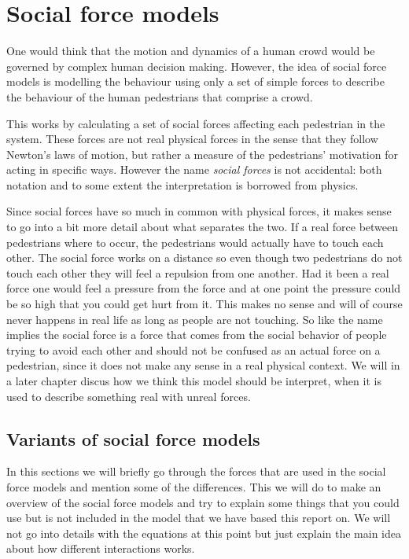 \section{Social force models}
\label{sec:social-forces}
One would think that the motion and dynamics of a human crowd would be 
governed by complex human decision making. However, the idea of social force 
models is modelling the behaviour using only a set of simple forces to 
describe the behaviour of the human pedestrians that comprise a crowd.

This works by calculating a set of social forces affecting each pedestrian in the system.
These forces are not real physical forces in the sense 
that they follow Newton's laws of motion, but rather a measure of the pedestrians' 
motivation for acting in specific ways. However the name \emph{social forces} 
is not accidental: both notation and to some extent the interpretation is 
borrowed from physics. 

Since social forces have so much in common with physical forces, it makes 
sense to go into a bit more detail about what separates the two. If a real
force between pedestrians where to occur, the pedestrians would actually have
to touch each other. The social force works on a distance so even though
two pedestrians do not touch each other they will feel a repulsion from one another. Had it been a real force one
would feel a pressure from the force and at one point the pressure could be
so high that you could get hurt from it. This makes no sense and will of course
never happens in real life as long as people are not touching. So like the name
implies the social force is a force that comes from the social behavior of people
trying to avoid each other and should not be confused as an actual force on a pedestrian,
since it does not make any sense in a real physical context.  We will in a later chapter discus
 how we think this model should be interpret, when it is used to describe something real with unreal forces.   


\subsection{Variants of social force models}
In this sections we will briefly go through the forces that are used in the social force models and mention some of the differences. This we will do to make an overview of the social force models and try to explain some things that you could use but is not included in the model that we have based this report on. We will not go into details with the equations at this point but just explain the main idea about how different interactions works. 

